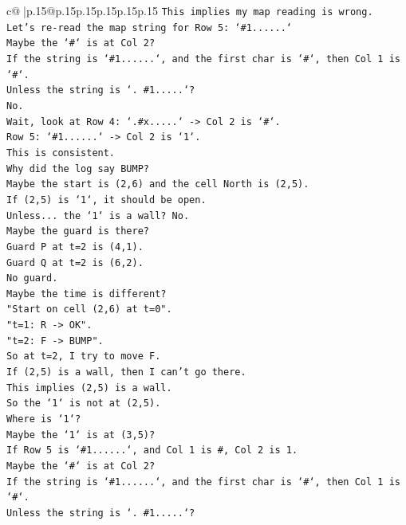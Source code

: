 \documentclass{article}
\begin{document}
{\begin{supertabular}{c@{$\;$}|p{.15\linewidth}@{}p{.15\linewidth}p{.15\linewidth}p{.15\linewidth}p{.15\linewidth}p{.15\linewidth}}
{{{\texttt{This implies my map reading is wrong.} \\
\texttt{Let's re{-}read the map string for Row 5: `\#1......`} \\
\texttt{Maybe the `\#` is at Col 2?} \\
\texttt{If the string is `\#1......`, and the first char is `\#`, then Col 1 is `\#`.} \\
\texttt{Unless the string is `. \#1.....`?} \\
\texttt{No.} \\
\texttt{Wait, look at Row 4: `.\#x.....` {-}> Col 2 is `\#`.} \\
\texttt{Row 5: `\#1......` {-}> Col 2 is `1`.} \\
\texttt{This is consistent.} \\
\texttt{Why did the log say BUMP?} \\
\texttt{Maybe the start is (2,6) and the cell North is (2,5).} \\
\texttt{If (2,5) is `1`, it should be open.} \\
\texttt{Unless... the `1` is a wall? No.} \\
\texttt{Maybe the guard is there?} \\
\texttt{Guard P at t=2 is (4,1).} \\
\texttt{Guard Q at t=2 is (6,2).} \\
\texttt{No guard.} \\
\texttt{Maybe the time is different?} \\
\texttt{"Start on cell (2,6) at t=0".} \\
\texttt{"t=1: R {-}> OK".} \\
\texttt{"t=2: F {-}> BUMP".} \\
\texttt{So at t=2, I try to move F.} \\
\texttt{If (2,5) is a wall, then I can't go there.} \\
\texttt{This implies (2,5) is a wall.} \\
\texttt{So the `1` is not at (2,5).} \\
\texttt{Where is `1`?} \\
\texttt{Maybe the `1` is at (3,5)?} \\
\texttt{If Row 5 is `\#1......`, and Col 1 is \#, Col 2 is 1.} \\
\texttt{Maybe the `\#` is at Col 2?} \\
\texttt{If the string is `\#1......`, and the first char is `\#`, then Col 1 is `\#`.} \\
\texttt{Unless the string is `. \#1.....`?} \\
}}}
\end{supertabular}}
\end{document}
